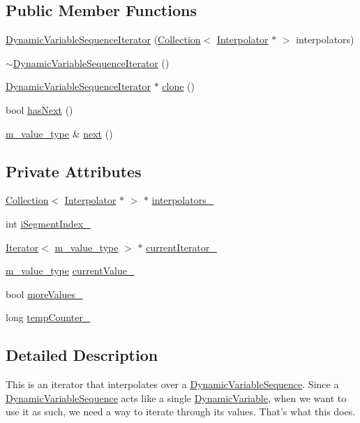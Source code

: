\subsection*{Public Member Functions}
\begin{CompactItemize}
\item 
\hyperlink{classDynamicVariableSequenceIterator_a0}{Dynamic\-Variable\-Sequence\-Iterator} (\hyperlink{classCollection}{Collection}$<$ \hyperlink{classInterpolator}{Interpolator} $\ast$ $>$ interpolators)
\item 
\hyperlink{classDynamicVariableSequenceIterator_a1}{$\sim$Dynamic\-Variable\-Sequence\-Iterator} ()
\item 
\hyperlink{classDynamicVariableSequenceIterator}{Dynamic\-Variable\-Sequence\-Iterator} $\ast$ \hyperlink{classDynamicVariableSequenceIterator_a2}{clone} ()
\item 
bool \hyperlink{classDynamicVariableSequenceIterator_a3}{has\-Next} ()
\item 
\hyperlink{Types_8h_a3}{m\_\-value\_\-type} \& \hyperlink{classDynamicVariableSequenceIterator_a4}{next} ()
\end{CompactItemize}
\subsection*{Private Attributes}
\begin{CompactItemize}
\item 
\hyperlink{classCollection}{Collection}$<$ \hyperlink{classInterpolator}{Interpolator} $\ast$ $>$ $\ast$ \hyperlink{classDynamicVariableSequenceIterator_r0}{interpolators\_\-}
\item 
int \hyperlink{classDynamicVariableSequenceIterator_r1}{i\-Segment\-Index\_\-}
\item 
\hyperlink{classIterator}{Iterator}$<$ \hyperlink{Types_8h_a3}{m\_\-value\_\-type} $>$ $\ast$ \hyperlink{classDynamicVariableSequenceIterator_r2}{current\-Iterator\_\-}
\item 
\hyperlink{Types_8h_a3}{m\_\-value\_\-type} \hyperlink{classDynamicVariableSequenceIterator_r3}{current\-Value\_\-}
\item 
bool \hyperlink{classDynamicVariableSequenceIterator_r4}{more\-Values\_\-}
\item 
long \hyperlink{classDynamicVariableSequenceIterator_r5}{temp\-Counter\_\-}
\end{CompactItemize}


\subsection{Detailed Description}
This is an iterator that interpolates over a \hyperlink{classDynamicVariableSequence}{Dynamic\-Variable\-Sequence}. Since a \hyperlink{classDynamicVariableSequence}{Dynamic\-Variable\-Sequence} acts like a single \hyperlink{classDynamicVariable}{Dynamic\-Variable}, when we want to use it as such, we need a way to iterate through its values. That's what this does.

